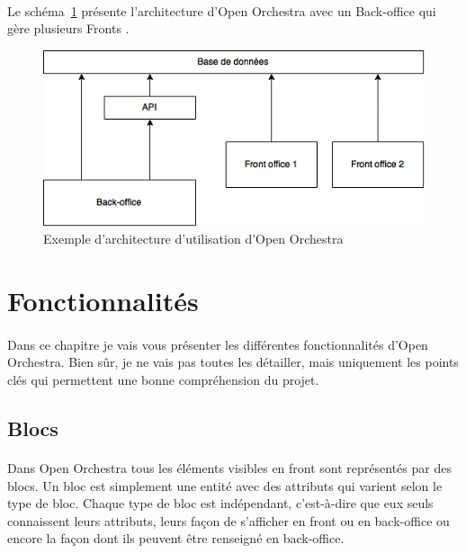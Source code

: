 	    \paragraph{}	
		Le schéma~\ref{architecture} présente l'architecture d'Open Orchestra avec un \og Back-office \fg{} qui gère plusieurs \og Fronts \fg{}.
		\begin{figure}[H]
        \begin{center}
          \includegraphics[scale=0.75]{images/architecture_open_orchestra}
        \end{center}
        \caption{Exemple d'architecture d'utilisation d'Open Orchestra}
        \label{architecture}
      \end{figure}

   
\section{Fonctionnalités}
	    \paragraph{}
	    Dans ce chapitre je vais vous présenter les différentes fonctionnalités d'Open Orchestra. Bien sûr, je ne vais pas toutes les détailler, mais uniquement les points clés qui permettent une bonne compréhension du projet.
	      \subsection{Blocs}
	        \label{Blocs}  
	       \paragraph{}
	      Dans Open Orchestra tous les éléments visibles en front sont représentés par des blocs. Un bloc est simplement une entité avec des attributs qui varient selon le type de bloc. Chaque type de bloc est indépendant, c'est-à-dire que eux seuls connaissent leurs attributs, leurs façon de s'afficher en front ou en back-office ou encore la façon dont ils peuvent être renseigné en back-office. 

